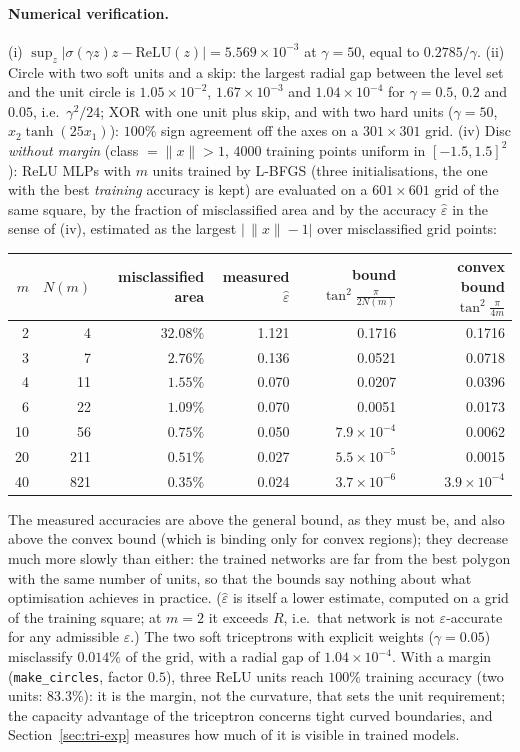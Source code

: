 \documentclass[11pt,a4paper]{article}
\theoremstyle{plain}
\theoremstyle{definition}
\theoremstyle{remark}
\begin{document}
\paragraph{Numerical verification.} (i) $\sup_z|\sigma(\gamma z)z-\mathrm{ReLU}(z)|=5.569\times10^{-3}$
at $\gamma=50$, equal to $0.2785/\gamma$. (ii) Circle with two soft units
and a skip: the largest radial gap between the level set and the unit circle
is $1.05\times10^{-2}$, $1.67\times10^{-3}$ and $1.04\times10^{-4}$ for
$\gamma=0.5$, $0.2$ and $0.05$, i.e.\ $\gamma^2/24$; XOR with one unit plus
skip, and with two hard units ($\gamma=50$, $x_2\tanh(25x_1)$): $100\%$ sign
agreement off the axes on a $301\times301$ grid. (iv) Disc \emph{without
margin} (class $=\|x\|>1$, $4000$ training points uniform in
$[-1.5,1.5]^2$): ReLU MLPs with $m$ units trained by L-BFGS (three
initialisations, the one with the best \emph{training} accuracy is kept) are
evaluated on a $601\times601$ grid of the same square, by the fraction of
misclassified area and by the accuracy $\hat\varepsilon$ in the sense of
(iv), estimated as the largest $|\,\|x\|-1|$ over misclassified grid points:
\begin{center}
\small
\begin{tabular}{@{}rrrrrr@{}}
\toprule
$m$ & $N(m)$ & misclassified area & measured $\hat\varepsilon$ & bound $\tan^2\frac{\pi}{2N(m)}$ & convex bound $\tan^2\frac{\pi}{4m}$ \\
\midrule
2 & 4 & $32.08\%$ & 1.121 & 0.1716 & 0.1716 \\
3 & 7 & $2.76\%$ & 0.136 & 0.0521 & 0.0718 \\
4 & 11 & $1.55\%$ & 0.070 & 0.0207 & 0.0396 \\
6 & 22 & $1.09\%$ & 0.070 & 0.0051 & 0.0173 \\
10 & 56 & $0.75\%$ & 0.050 & $7.9\times10^{-4}$ & 0.0062 \\
20 & 211 & $0.51\%$ & 0.027 & $5.5\times10^{-5}$ & 0.0015 \\
40 & 821 & $0.35\%$ & 0.024 & $3.7\times10^{-6}$ & $3.9\times10^{-4}$ \\
\bottomrule
\end{tabular}
\end{center}
The measured accuracies are above the general bound, as they must be, and
also above the convex bound (which is binding only for convex regions); they
decrease much more slowly than either: the trained networks are far from
the best polygon with the same number of units, so that the bounds say
nothing about what optimisation achieves in practice. ($\hat\varepsilon$ is
itself a lower estimate, computed on a grid of the training square; at
$m=2$ it exceeds $R$, i.e.\ that network is not $\varepsilon$-accurate for
any admissible $\varepsilon$.) The two soft triceptrons with explicit
weights ($\gamma=0.05$) misclassify $0.014\%$ of the grid, with a radial gap
of $1.04\times10^{-4}$. With a margin (\texttt{make\_circles}, factor $0.5$),
three ReLU units reach $100\%$ training accuracy (two units: $83.3\%$): it is
the margin, not the curvature, that sets the unit requirement; the
capacity advantage of the triceptron concerns tight curved boundaries, and
Section~\ref{sec:tri-exp} measures how much of it is visible in trained
models.
\end{document}
